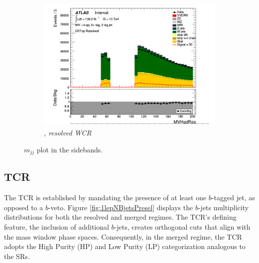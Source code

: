 \begin{figure}[ht]
    \centering
    \begin{subfigure}{0.3\textwidth}
        \includegraphics[width=\linewidth]{figures/1lep/CRPlots/C_0ptag2pjet_0ptv_CRVjet_MVHadRes_Lin.png}
        \caption{\emph{\olep, resolved WCR}}
    \end{subfigure}
    \caption{$m_{jj}$ plot in the sidebands.}
    \label{fig:1lep2lepMVHadResCR}
\end{figure}

\clearpage
\subsection{TCR}



The TCR is established by mandating the presence of at least one $b$-tagged jet, as opposed to a $b$-veto. Figure \ref{fig:1lepNBjetsPresel} displays the $b$-jets multiplicity distributions for both the resolved and merged regimes. The TCR's defining feature, the inclusion of additional $b$-jets, creates orthogonal cuts that align with the mass window phase spaces. Consequently, in the merged regime, the TCR adopts the High Purity (HP) and Low Purity (LP) categorization analogous to the SRs.

